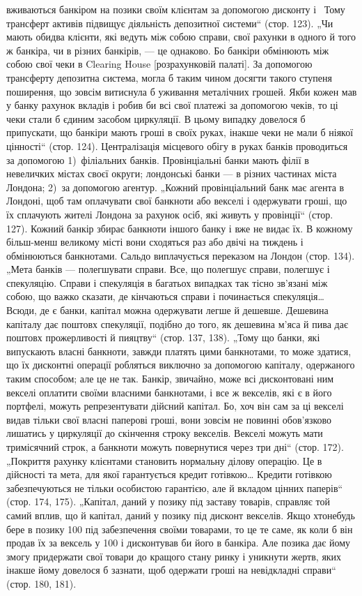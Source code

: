 вживаються банкіром на позики своїм клієнтам за
допомогою дисконту і~ Тому трансферт активів підвищує діяльність депозитної системи“ (стор.
123). „Чи мають обидва клієнти, які ведуть між собою
справи, свої рахунки в одного й того ж банкіра, чи в різних банкірів, — це
однаково. Бо банкіри обмінюють між собою свої чеки в Clearing House [розрахунковій палаті]. За
допомогою трансферту депозитна система, могла б
таким чином досягти такого ступеня поширення, що зовсім витиснула б
уживання металічних грошей. Якби кожен мав у банку рахунок вкладів і робив би всі свої платежі за
допомогою чеків, то ці чеки стали б єдиним засобом циркуляції. В цьому випадку довелося б
припускати, що банкіри мають
гроші в своїх руках, інакше чеки не мали б ніякої цінності“ (стор. 124). Централізація місцевого
обігу в руках банків проводиться за допомогою 1)~філіальних банків. Провінціальні банки мають філії
в невеличких містах своєї округи;
лондонські банки — в різних частинах міста Лондона; 2)~за допомогою агентур.
„Кожний провінціальний банк має агента в Лондоні, щоб там оплачувати свої
банкноти або векселі і одержувати гроші, що їх сплачують жителі Лондона за рахунок осіб, які живуть
у провінції“ (стор. 127). Кожний банкір збирає банкноти
іншого банку і вже не видає їх. В кожному більш-менш великому місті
вони сходяться раз або двічі на тиждень і обмінюються банкнотами. Сальдо
виплачується переказом на Лондон (стор. 134). „Мета банків — полегшувати
справи. Все, що полегшує справи, полегшує і спекуляцію. Справи і спекуляція
в багатьох випадках так тісно зв’язані між собою, що важко сказати, де кінчаються справи і
починається спекуляція\dots{} Всюди, де є банки, капітал можна
одержувати легше й дешевше. Дешевина капіталу дає поштовх спекуляції,
подібно до того, як дешевина м’яса й пива дає поштовх прожерливості й пияцтву“ (стор. 137, 138).
„Тому що банки, які випускають власні банкноти, завжди
платять цими банкнотами, то може здатися, що їх дисконтні операції робляться
виключно за допомогою капіталу, одержаного таким способом; але це не так.
Банкір, звичайно, може всі дисконтовані ним векселі оплатити своїми власними
банкнотами, і все ж  векселів, які є в його портфелі, можуть репрезентувати дійсний капітал. Бо,
хоч він сам за ці векселі видав тільки свої власні паперові гроші, вони зовсім не повинні
обов’язково лишатись у циркуляції до
скінчення строку векселів. Векселі можуть мати тримісячний строк, а банкноти
можуть повернутися через три дні“ (стор. 172). „Покриття рахунку клієнтами
становить нормальну ділову операцію. Це в дійсності та мета, для якої
гарантується кредит готівкою\dots{} Кредити готівкою забезпечуються не тільки
особистою гарантією, але й вкладом цінних паперів“ (стор. 174, 175). „Капітал,
даний у позику під заставу товарів, справляє той самий вплив, що й капітал,
даний у позику під дисконт векселів. Якщо хтонебудь бере в позику 100 під забезпечення своїми товарами, то це те саме, як коли б він продав
їх за вексель у 100 і дисконтував би його в банкіра.
Але позика дає йому змогу придержати свої товари до кращого стану ринку і
уникнути жертв, яких інакше йому довелося б зазнати, щоб одержати гроші
на невідкладні справи“ (стор. 180, 181).

